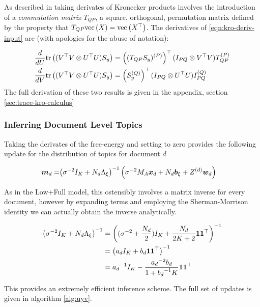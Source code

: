 As described in \cite{Minka2000a} taking derivates of Kronecker products involves the introduction of a \emph{commutation matrix} $T_{QP}$, a square, orthogonal, permutation matrix defined by the property that $T_{QP} \text{vec}\left(X\right) = \text{vec}\left(X^\top\right)$. The derivatives of \eqref{eqn:kro-deriv-input} are (with apologies for the abuse of notation):

\begin{align}
\frac{d}{dU} \text{tr} \left( {(V^\top V \otimes U^\top U)S_y} \right) 
& = \left( { (T_{QP} S_y)^{(P)} } \right)^\top (I_{PQ} \otimes V^\top V){ T_{QP}^{(P)} }
\\
\frac{d}{dV} \text{tr} \left( {(V^\top V \otimes U^\top U)S_y} \right) 
& = \left({ S_y^{(Q)} }\right)^\top (I_{PQ} \otimes U^\top U) { I_{PQ}^{(Q)} }
\end{align}
The full derivation of these two results is given in the appendix, section \ref{sec:trace-kro-calculus}


\subsubsection{Inferring Document Level Topics}
Taking the derivates of the free-energy and setting to zero provides the following update for the distribution of topics for document $d$

\begin{align}
\bm m_d = & {\left( \sigma^{-2}I_K + N_d { \Lambda_{\xi} } \right)}^{-1} \left(\sigma^{-2} M_A { \bm x_d }  + N_d { \bm b_{\xi} } + Z^{(d)}\bm w_d \right )
\end{align}

As in the Low+Full model, this ostensibly involves a matrix inverse for every document, however by expanding terms and employing the Sherman-Morrison identity we can actually obtain the inverse analytically.

\begin{align}
{\left( \sigma^{-2}I_K + N_d  { \Lambda_{\xi} } \right)}^{-1}
& = {\left( (\sigma^{-2} + \frac{N_d}{2})I_K + \frac{N_d}{2K + 2} \mathbf{1} \mathbf{1}^\top \right)}^{-1} \\
& = {\left( a_d I_K + b_d \mathbf{1}\mathbf{1}^\top \right)}^{-1} \\
& = {a_d}^{-1} I_K - \frac{{a_d}^{-2}b_d }{1 + {b_d}^{-1}K}\mathbf{1}\mathbf{1}^\top
\end{align}

This provides an extremely efficient inference scheme. The full set of updates is given in algorithm \ref{alg:uyv}.

\newcommand \mvy  { \vv{m}_{\vv{y}} }
\newcommand \sigvy { { S_Y } }

\newcommand \mmy  { M_Y      }
\newcommand \omy  { \Omega_Y }
\newcommand \sigy { \Sigma_Y }


